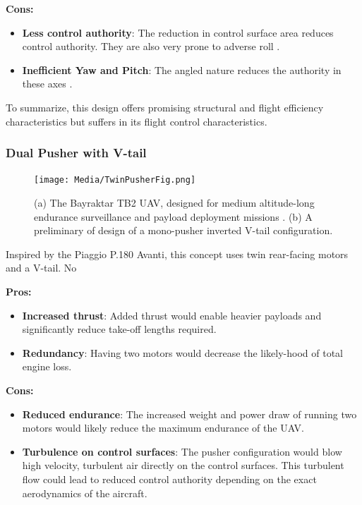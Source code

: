 \documentclass[12pt]{article}
\begin{document}
	\textbf{Cons:}
	\begin{itemize}
		\item \textbf{Less control authority}: The reduction in control surface area reduces control authority. They are also very prone to adverse roll \cite{}.
		\item \textbf{Inefficient Yaw and Pitch}: The angled nature reduces the authority in these axes \cite{}.
	\end{itemize}
	
	To summarize, this design offers promising structural and flight efficiency characteristics but suffers in its flight control characteristics.
	
	\newpage
	
	\subsubsection{Dual Pusher with V-tail}
	\begin{figure}[h!]
		\centering
		\texttt{[image: Media/TwinPusherFig.png]} %
		\caption{(a) The Bayraktar TB2 UAV, designed for medium altitude-long endurance surveillance and payload deployment missions \cite{}. (b) A preliminary of design of a mono-pusher inverted V-tail configuration.}
	\end{figure}
	Inspired by the Piaggio P.180 Avanti, this concept uses twin rear-facing motors and a V-tail. No
	
	\textbf{Pros:}
	\begin{itemize}
		\item \textbf{Increased thrust}: Added thrust would enable heavier payloads and significantly reduce take-off lengths required.
		\item \textbf{Redundancy}: Having two motors would decrease the likely-hood of total engine loss.
	\end{itemize}
	
	\textbf{Cons:}
	\begin{itemize}
		\item \textbf{Reduced endurance}: The increased weight and power draw of running two motors would likely reduce the maximum endurance of the UAV.
		\item \textbf{Turbulence on control surfaces}: The pusher configuration would blow high velocity, turbulent air directly on the control surfaces. This turbulent flow could lead to reduced control authority depending on the exact aerodynamics of the aircraft.
	\end{itemize}
	
\end{document}
